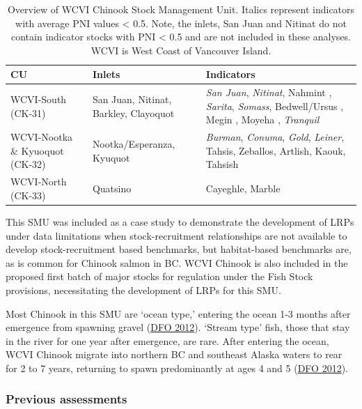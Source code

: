 \documentclass[11pt]{book}
\begin{document}
\renewcommand*{\arraystretch}{1.5}
\begin{table}[ht]
\centering
\caption{Overview of WCVI Chinook Stock Management Unit. Italics represent indicators with average PNI values < 0.5. Note, the inlets, San Juan and Nitinat do not contain indicator stocks with PNI < 0.5 and are not included in these analyses. WCVI is West Coast of Vancouver Island.}
\begin{tabular}{p{}p{}p{}}
\hline
CU       &  Inlets   & Indicators\\ 
\hline
WCVI-South (CK-31) & San Juan, Nitinat, Barkley, Clayoquot & \emph{San Juan}, \emph{Nitinat}, Nahmint , \emph{Sarita}, \emph{Somass}, Bedwell/Ursus , Megin , Moyeha , \emph{Tranquil} \\
WCVI-Nootka \& Kyuoquot (CK-32) & Nootka/Esperanza, Kyuquot & \emph{Burman}, \emph{Conuma}, \emph{Gold}, \emph{Leiner}, Tahsis, Zeballos, Artlish, Kaouk, Tahsish \\
WCVI-North (CK-33) &  Quatsino  & Cayeghle, Marble \\                     
\hline
\end{tabular}
\label{tab:chinook-Overview}
\end{table}
This SMU was included as a case study to demonstrate the development of LRPs under data limitations when stock-recruitment relationships are not available to develop stock-recruitment based benchmarks, but habitat-based benchmarks are, as is common for Chinook salmon in BC. WCVI Chinook is also included in the proposed first batch of major stocks for regulation under the Fish Stock provisions, necessitating the development of LRPs for this SMU.

Most Chinook in this SMU are `ocean type,' entering the ocean 1-3 months after emergence from spawning gravel (\protect\hyperlink{ref-dfoAssessmentWestCoast2012}{DFO 2012}). `Stream type' fish, those that stay in the river for one year after emergence, are rare. After entering the ocean, WCVI Chinook migrate into northern BC and southeast Alaska waters to rear for 2 to 7 years, returning to spawn predominantly at ages 4 and 5 (\protect\hyperlink{ref-dfoAssessmentWestCoast2012}{DFO 2012}).

\hypertarget{previous-assessments-1}{%
\subsubsection{Previous assessments}\label{previous-assessments-1}}
\end{document}
